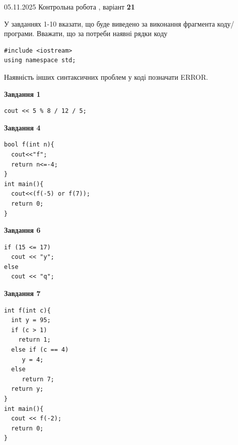 \documentclass[12pt, ukrainian]{article}
\begin{document}
{\Large{05.11.2025 Контрольна робота , варіант  \No \textbf { 21 }\par}}
{
\begin {large}
У завданнях 1-10 вказати, що буде виведено за виконання фрагмента коду/про\-гра\-ми.
Вважати, що за потреби наявні рядки коду
\begin{verbatim}
#include <iostream>
using namespace std;
\end{verbatim}
Наявність інших синтаксичних проблем у коді позначати ERROR.

\begin{minipage}[t]{7.0cm}

\begin{center}
\textbf{Завдання 1}
\end{center}
\vspace{-8mm}

\begin{verbatim}
cout << 5 % 8 / 12 / 5;
\end{verbatim}



\begin{center}
\textbf{Завдання 4}
\end{center}
\vspace{-8mm}

\begin{verbatim}
bool f(int n){
  cout<<"f";
  return n<=-4;
}
int main(){
  cout<<(f(-5) or f(7));
  return 0;
}
\end{verbatim}



\begin{center}
\textbf{Завдання 6}
\end{center}
\vspace{-8mm}

\begin{verbatim}
if (15 <= 17)
  cout << "y";
else
  cout << "q";
\end{verbatim}



\begin{center}
\textbf{Завдання 7}
\end{center}
\vspace{-8mm}

\begin{verbatim}
int f(int c){
  int y = 95;
  if (c > 1)
    return 1;
  else if (c == 4)
     y = 4;
  else
     return 7;
  return y;
}
int main(){
  cout << f(-2);
  return 0;
}
\end{verbatim}


\end{minipage}
\end{large}}
\end{document}
